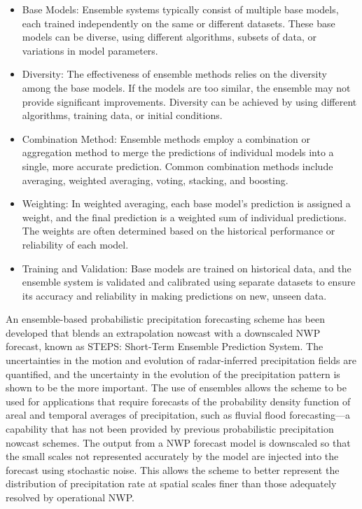 \documentclass[../paper.tex]{subfiles}
\begin{document}
\begin{itemize}
    \item Base Models: Ensemble systems typically consist of multiple base models,
    each trained independently on the same or different datasets.
    These base models can be diverse, using different algorithms, subsets of data, or variations in model parameters.

    \item Diversity: The effectiveness of ensemble methods relies on the diversity among the base models.
    If the models are too similar, the ensemble may not provide significant improvements.
    Diversity can be achieved by using different algorithms, training data, or initial conditions.

    \item Combination Method:
    Ensemble methods employ a combination or aggregation method
    to merge the predictions of individual models into a single,
    more accurate prediction.
    Common combination methods include averaging, weighted averaging, voting, stacking, and boosting.

    \item Weighting: In weighted averaging, each base model's prediction is assigned a weight,
    and the final prediction is a weighted sum of individual predictions.
    The weights are often determined based on the historical performance or reliability of each model.

    \item Training and Validation: Base models are trained on historical data,
    and the ensemble system is validated and calibrated
    using separate datasets to ensure its accuracy and reliability in making predictions on new,
    unseen data.
\end{itemize}

An ensemble-based probabilistic precipitation forecasting scheme has been developed that blends an extrapolation nowcast with a downscaled NWP forecast,
known as STEPS: Short-Term Ensemble Prediction System.
The uncertainties in the motion and evolution of radar-inferred precipitation fields are quantified,
and the uncertainty in the evolution of the precipitation pattern is shown to be the more important.
The use of ensembles allows the scheme
to be used for applications
that require forecasts of the probability density function of areal and temporal averages of precipitation,
such as fluvial flood forecasting—a capability
that has not been provided by previous probabilistic precipitation nowcast schemes.
The output from a NWP forecast model is downscaled
so that the small scales not represented accurately by the model are injected into the forecast
using stochastic noise.
This allows the scheme
to better represent the distribution of precipitation rate at spatial scales finer than those
adequately resolved by operational NWP\@.
\end{document}
